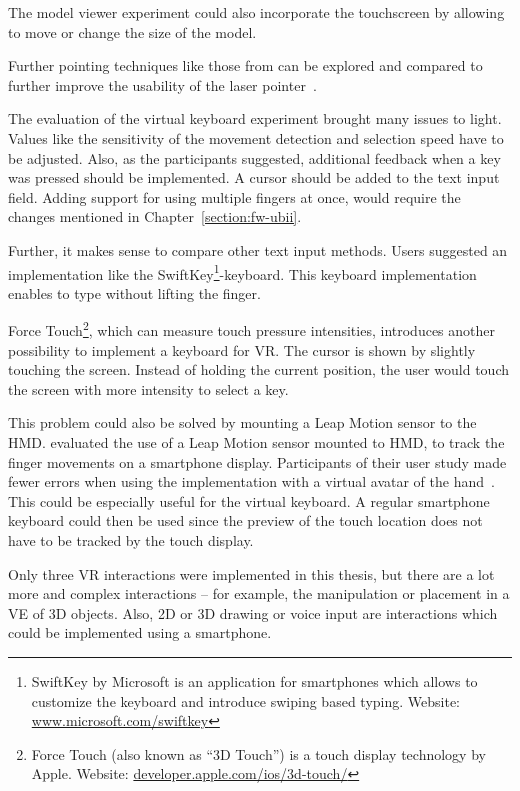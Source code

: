 The model viewer experiment could also incorporate the touchscreen by allowing to move or change the size of the model.

Further pointing techniques like those from \citeauthor{Argelaguet.2013} can be explored and compared to further improve the usability of the laser pointer~\cite[123]{Argelaguet.2013}.

The evaluation of the virtual keyboard experiment brought many issues to light. 
Values like the sensitivity of the movement detection and selection speed have to be adjusted. Also, as the participants suggested, additional feedback when a key was pressed should be implemented. A cursor should be added to the text input field. Adding support for using multiple fingers at once, would require the changes mentioned in Chapter~\ref{section:fw-ubii}.

Further, it makes sense to compare other text input methods. Users suggested an implementation like the SwiftKey\footnote{SwiftKey by Microsoft is an application for smartphones which allows to customize the keyboard and introduce swiping based typing. Website: \href{https://www.microsoft.com/swiftkey}{www.microsoft.com/swiftkey}}-keyboard. This keyboard implementation enables to type without lifting the finger. 

Force Touch\footnote{Force Touch (also known as \enquote{3D Touch}) is a touch display technology by Apple. Website: \href{https://developer.apple.com/ios/3d-touch/}{developer.apple.com/ios/3d-touch/}}, which can measure touch pressure intensities, introduces another possibility to implement a keyboard for \ac{VR}. The cursor is shown by slightly touching the screen. Instead of holding the current position, the user would touch the screen with more intensity to select a key. 

This problem could also be solved by mounting a Leap Motion sensor to the \ac{HMD}. \citeauthor{Afonso.2017} evaluated the use of a Leap Motion sensor mounted to \ac{HMD}, to track the finger movements on a smartphone display. Participants of their user study made fewer errors when using the implementation with a virtual avatar of the hand~\cite[247\psq]{Afonso.2017}. This could be especially useful for the virtual keyboard. A regular smartphone keyboard could then be used since the preview of the touch location does not have to be tracked by the touch display.

Only three \ac{VR} interactions were implemented in this thesis, but there are a lot more and complex interactions -- for example, the manipulation or placement in a \ac{VE} of \ac{3D} objects. Also, \ac{2D} or \ac{3D} drawing or voice input are interactions which could be implemented using a smartphone. %

